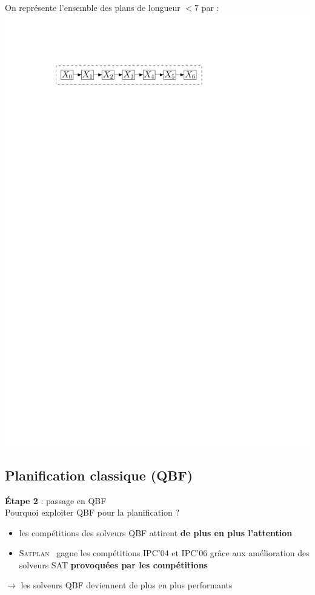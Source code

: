 \documentclass[english,french,usenames,dvipsnames]{beamer}
\begin{document}
\begin{frame}{\subsecname}
On représente l'ensemble des plans de longueur $< 7$ par : \\[10pt]
\includegraphics[width=1\textwidth]{figures/coplas2018/planif-tree-3a.pdf}
\end{frame}

\subsection{Planification classique (QBF)}

\begin{frame}{\subsecname}
\textbf{Étape 2} : passage en QBF \\[10pt]
Pourquoi exploiter QBF pour la planification ?
\begin{itemize}
\item les compétitions des solveurs QBF attirent \textbf{de plus en plus l'attention}
\item \textsc{Satplan}~ gagne les compétitions IPC'04 et IPC'06 \nocite{KAU04,KSH06} grâce aux amélioration des solveurs SAT \textbf{provoquées par les compétitions}
\end{itemize}
\begin{center}
$\longrightarrow$ les solveurs QBF deviennent de plus en plus performants
\end{center}
\end{frame}
\end{document}
